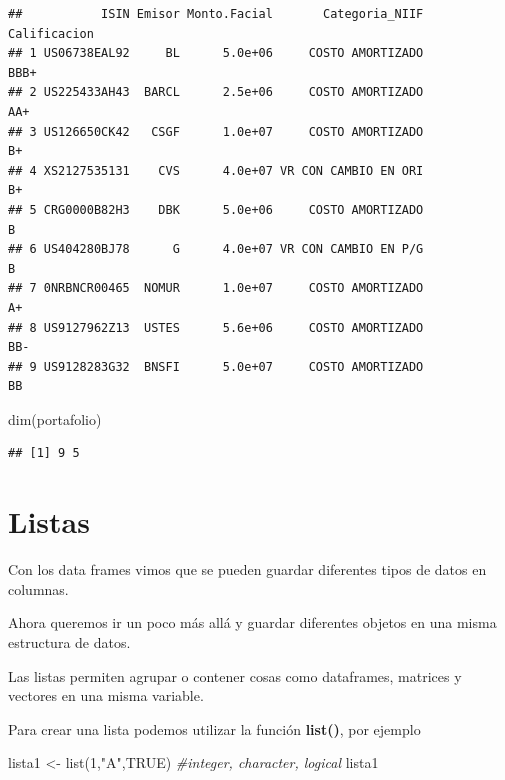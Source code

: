\documentclass[
  12pt,
]{book}
\newenvironment{Shaded}{\begin{snugshade}}{\end{snugshade}}
\newcommand{\CommentTok}[1]{\textcolor[rgb]{0.56,0.35,0.01}{\textit{#1}}}
\newcommand{\ConstantTok}[1]{\textcolor[rgb]{0.00,0.00,0.00}{#1}}
\newcommand{\DecValTok}[1]{\textcolor[rgb]{0.00,0.00,0.81}{#1}}
\newcommand{\FunctionTok}[1]{\textcolor[rgb]{0.00,0.00,0.00}{#1}}
\newcommand{\NormalTok}[1]{#1}
\newcommand{\OtherTok}[1]{\textcolor[rgb]{0.56,0.35,0.01}{#1}}
\newcommand{\StringTok}[1]{\textcolor[rgb]{0.31,0.60,0.02}{#1}}
\begin{document}
\begin{verbatim}
##           ISIN Emisor Monto.Facial       Categoria_NIIF Calificacion
## 1 US06738EAL92     BL      5.0e+06     COSTO AMORTIZADO         BBB+
## 2 US225433AH43  BARCL      2.5e+06     COSTO AMORTIZADO          AA+
## 3 US126650CK42   CSGF      1.0e+07     COSTO AMORTIZADO           B+
## 4 XS2127535131    CVS      4.0e+07 VR CON CAMBIO EN ORI           B+
## 5 CRG0000B82H3    DBK      5.0e+06     COSTO AMORTIZADO            B
## 6 US404280BJ78      G      4.0e+07 VR CON CAMBIO EN P/G            B
## 7 0NRBNCR00465  NOMUR      1.0e+07     COSTO AMORTIZADO           A+
## 8 US9127962Z13  USTES      5.6e+06     COSTO AMORTIZADO          BB-
## 9 US9128283G32  BNSFI      5.0e+07     COSTO AMORTIZADO           BB
\end{verbatim}

\begin{Shaded}
\begin{Highlighting}[]
\FunctionTok{dim}\NormalTok{(portafolio)}
\end{Highlighting}
\end{Shaded}

\begin{verbatim}
## [1] 9 5
\end{verbatim}

\hypertarget{listas}{%
\section{\texorpdfstring{\textbf{Listas}}{Listas}}\label{listas}}

Con los data frames vimos que se pueden guardar diferentes tipos de datos en columnas.

Ahora queremos ir un poco más allá y guardar diferentes objetos en una misma estructura de datos.

Las listas permiten agrupar o contener cosas como dataframes, matrices y vectores en una misma variable.

Para crear una lista podemos utilizar la función \textbf{list()}, por ejemplo

\begin{Shaded}
\begin{Highlighting}[]
\NormalTok{lista1 }\OtherTok{\textless{}{-}} \FunctionTok{list}\NormalTok{(}\DecValTok{1}\NormalTok{,}\StringTok{"A"}\NormalTok{,}\ConstantTok{TRUE}\NormalTok{) }\CommentTok{\#integer, character, logical}
\NormalTok{lista1}
\end{Highlighting}
\end{Shaded}
\end{document}
